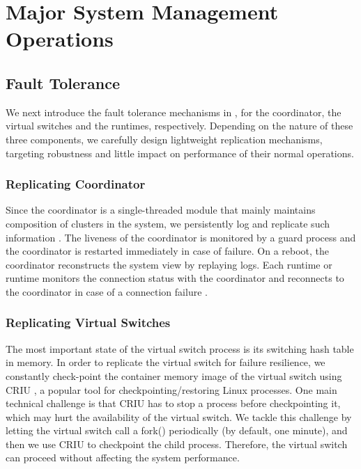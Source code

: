 \section{Major System Management Operations}
\label{sec:management}

\subsection{Fault Tolerance}
\label{sec:resilience}

We next introduce the fault tolerance mechanisms in \nfactor, for the coordinator, the virtual switches and the runtimes, respectively. 
Depending on the nature of these three components, we carefully design 
lightweight replication mechanisms, targeting robustness and little impact on performance of their normal operations.

\subsubsection{Replicating Coordinator}

Since the coordinator is a single-threaded module that mainly maintains composition of clusters in the system, we persistently log and replicate such information . The liveness of the coordinator is monitored by a guard process and the 
coordinator is restarted immediately in case of failure. On a reboot, the 
coordinator reconstructs the system view by replaying logs. 
Each runtime or runtime monitors the connection status with the coordinator 
and reconnects to the coordinator in case of a connection failure .

\subsubsection{Replicating Virtual Switches}

 The most important state of the virtual switch process is its switching hash 
table in memory. In order to replicate the virtual switch for failure resilience, we constantly 
check-point the container memory image of the virtual switch using CRIU 
\cite{criu}, a popular tool for checkpointing/restoring Linux processes. One main 
technical challenge is that CRIU has to stop a process before checkpointing it, 
which may hurt the availability of the virtual switch. We tackle this challenge by letting the virtual switch call a 
fork() periodically (by default, one minute), and then we use CRIU to checkpoint 
the child process. Therefore, the virtual switch can proceed without affecting 
the system performance.

